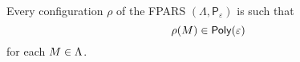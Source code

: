 \begin{lemma}\label{lemma:poly}
	Every configuration $\rho$ of the FPARS $\left(\Lambda,\mathsf{P}_{\varepsilon}\right)$ is such that
	$$
	\rho(M)\in \textsf{Poly}(\varepsilon)
	$$
	for each $M\in\Lambda$.
\end{lemma}
